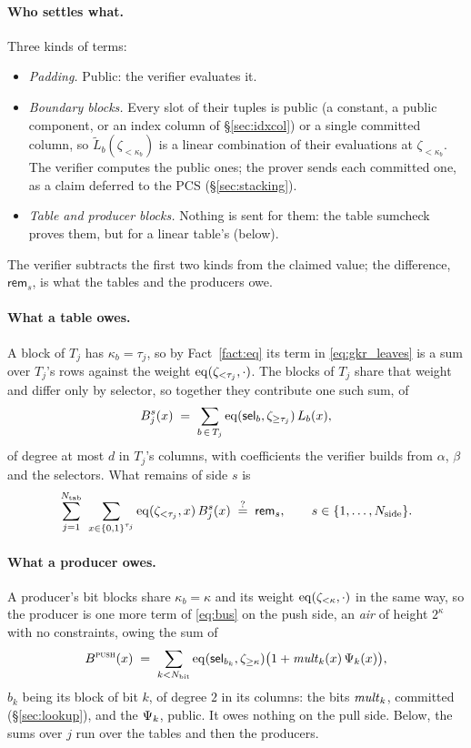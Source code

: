 \paragraph{Who settles what.} Three kinds of terms:
\begin{itemize}[itemsep=1pt,topsep=3pt]
\item \emph{Padding.} Public: the verifier evaluates it.
\item \emph{Boundary blocks.} Every slot of their tuples is public (a constant, a public component, or an index column of \S\ref{sec:idxcol}) or a single committed column, so $\widetilde L_b(\zeta_{<\kappa_b})$ is a linear combination of their evaluations at $\zeta_{<\kappa_b}$. The verifier computes the public ones; the prover sends each committed one, as a claim deferred to the PCS (\S\ref{sec:stacking}).
\item \emph{Table and producer blocks.} Nothing is sent for them: the table sumcheck proves them, but for a linear table's (below).
\end{itemize}
The verifier subtracts the first two kinds from the claimed value; the difference, $\mathsf{rem}_{s}$, is what the tables and the producers owe.

\paragraph{What a table owes.} A block of $T_j$ has $\kappa_b=\tau_j$, so by Fact~\ref{fact:eq} its term in \eqref{eq:gkr_leaves} is a sum over $T_j$'s rows against the weight $\operatorname{eq}(\zeta_{<\tau_j},\cdot)$. The blocks of $T_j$ share that weight and differ only by selector, so together they contribute one such sum, of
\begin{equation}\label{eq:bus_poly}
  B^{s}_j(x)\;=\;\sum_{b\,\in\,T_j}\operatorname{eq}(\mathsf{sel}_b,\zeta_{\ge\tau_j})\,L_b(x),
\end{equation}
of degree at most $d$ in $T_j$'s columns, with coefficients the verifier builds from $\alpha$, $\beta$ and the selectors. What remains of side $s$ is
\begin{equation}\label{eq:bus}
  \sum_{j=1}^{\ntab}\ \sum_{x\in\cube{\tau_j}}\eq(\zeta_{<\tau_j},x)\,B^{s}_j(x)\;\qeq\;\mathsf{rem}_{s},
  \qquad s\in\{1,\dots,\nside\}.
\end{equation}

\paragraph{What a producer owes.} A producer's bit blocks share $\kappa_b=\kappa$ and its weight $\operatorname{eq}(\zeta_{<\kappa},\cdot)$ in the same way, so the producer is one more term of \eqref{eq:bus} on the push side, an \emph{air} of height $2^{\kappa}$ with no constraints, owing the sum of
\[
  B^{\textsc{push}}(x)\;=\;\sum_{k<N_{\mathrm{bit}}}\operatorname{eq}(\mathsf{sel}_{b_k},\zeta_{\ge\kappa})\bigl(1+\mathit{mult}_{k}(x)\,\Psi_{k}(x)\bigr),
\]
$b_k$ being its block of bit $k$, of degree $2$ in its columns: the bits $\mathit{mult}_{k}$, committed (\S\ref{sec:lookup}), and the $\Psi_{k}$, public. It owes nothing on the pull side. Below, the sums over $j$ run over the tables and then the producers.

